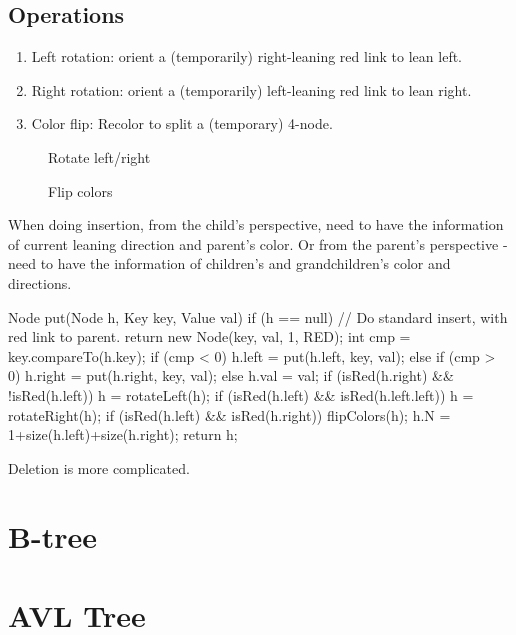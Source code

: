 \subsection{Operations}
\begin{enumerate}
\item Left rotation: orient a (temporarily) right-leaning red link to lean left.
\item Right rotation: orient a (temporarily) left-leaning red link to lean right. 
\item Color flip: Recolor to split a (temporary) 4-node. 
\end{enumerate}
\begin{figure}[hbtp]
\centering
{}
\caption{Rotate left/right}
\label{fig:LABEL}
\end{figure}

\begin{figure}[hbtp]
\centering
{}
\caption{Flip colors}
\label{fig:LABEL}
\end{figure}

 When doing insertion, from the child's perspective, need to have the information of current leaning direction and parent's color. Or from the parent's perspective - need to have the information of children's and grandchildren's color and directions.
\begin{java}
Node put(Node h, Key key, Value val) {
    if (h == null)  // Do standard insert, with red link to parent.
       return new Node(key, val, 1, RED);
    int cmp = key.compareTo(h.key);
    if      (cmp < 0) h.left  = put(h.left,  key, val);
    else if (cmp > 0) h.right = put(h.right, key, val);
    else h.val = val;
    if (isRed(h.right) && !isRed(h.left))    h = rotateLeft(h);
    if (isRed(h.left) && isRed(h.left.left)) h = rotateRight(h);
    if (isRed(h.left) && isRed(h.right))     flipColors(h);
    h.N = 1+size(h.left)+size(h.right);
    return h; 
}
\end{java}

 Deletion is more complicated. 

\section{B-tree}


\section{AVL Tree}
